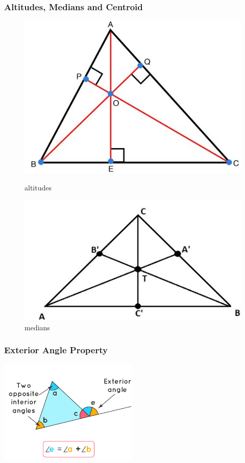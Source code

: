 \documentclass{beamer}
\begin{document}
\begin{frame}
    \frametitle{Altitudes, Medians and Centroid} 

    \begin{figure}[h]    
        \begin{minipage}[b]{0.4\textwidth}
        \centering
        \includegraphics[scale=0.25]{altitudes.jpeg}
        \caption{altitudes}
    \end{minipage}
    \begin{minipage}[b]{0.4\textwidth}
        \centering
        \includegraphics[scale=0.25]{medians.jpeg}
        \caption{medians}
    \end{minipage}
\end{figure}
\end{frame}

\begin{frame}
    \frametitle{Exterior Angle Property}
    \begin{center}
        \includegraphics[width=0.5\textwidth]{exterior_angle.png} 
    \end{center}
\end{frame}
\end{document}
